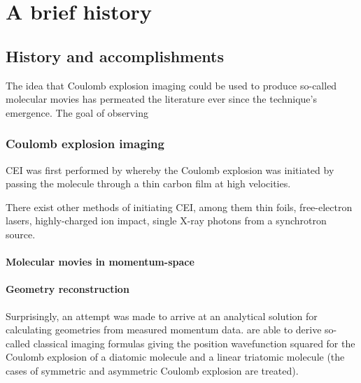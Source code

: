 \chapter{A brief history}\label{ch:history}

\section{History and accomplishments}
The idea that Coulomb explosion imaging could be used to produce so-called molecular movies has permeated the literature ever since the technique's emergence. The goal of observing 

\subsection{Coulomb explosion imaging}
CEI was first performed by \citet{Vager89} whereby the Coulomb explosion was initiated by passing the molecule through a thin carbon film at high velocities.

There exist other methods of initiating CEI, among them thin foils, free-electron lasers, highly-charged ion impact, single X-ray photons from a synchrotron source.

\subsubsection{Molecular movies in momentum-space}

\subsubsection{Geometry reconstruction}
Surprisingly, an attempt was made to arrive at an analytical solution for calculating geometries from measured momentum data. \citet{Nagaya04}  are able to derive so-called classical imaging formulas giving the position wavefunction squared for the Coulomb explosion of a diatomic molecule and a linear triatomic molecule (the cases of symmetric and asymmetric Coulomb explosion are treated).

